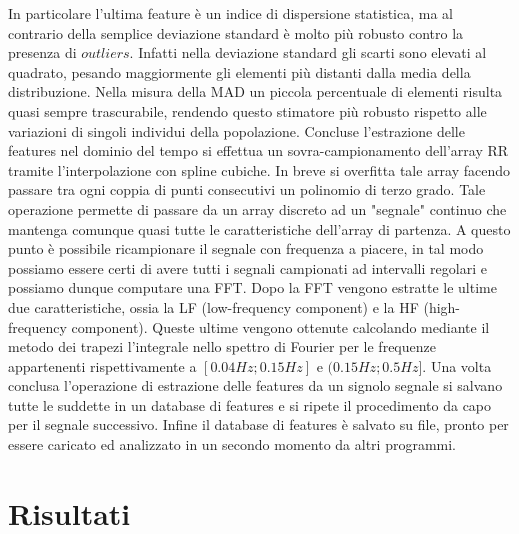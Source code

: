 \documentclass[a4paper, 12pt]{book}
\begin{document}
In particolare l'ultima feature è un indice di dispersione statistica, ma al contrario della semplice deviazione standard è molto più robusto contro la presenza di $outliers$.
Infatti nella deviazione standard gli scarti sono elevati al quadrato, pesando maggiormente gli elementi più distanti dalla media della distribuzione.
Nella misura della MAD un piccola percentuale di elementi risulta quasi sempre trascurabile, rendendo questo stimatore più robusto rispetto alle variazioni di singoli individui della popolazione.
Concluse l'estrazione delle features nel dominio del tempo si effettua un sovra-campionamento dell'array RR tramite l'interpolazione con spline cubiche.
In breve si overfitta tale array facendo passare tra ogni coppia di punti consecutivi un polinomio di terzo grado.
Tale operazione permette di passare da un array discreto ad un "segnale" continuo che mantenga comunque quasi tutte le caratteristiche dell'array di partenza.
A questo punto è possibile ricampionare il segnale con frequenza a piacere, in tal modo possiamo essere certi di avere tutti i segnali campionati ad intervalli regolari e possiamo dunque computare una FFT.
Dopo la FFT vengono estratte le ultime due caratteristiche, ossia la LF (low-frequency component) e la HF (high-frequency component).
Queste ultime vengono ottenute calcolando mediante il metodo dei trapezi l'integrale nello spettro di Fourier per le frequenze appartenenti rispettivamente a $[0.04Hz;0.15Hz]$ e $(0.15Hz;0.5Hz]$.
Una volta conclusa l'operazione di estrazione delle features da un signolo segnale si salvano tutte le suddette in un database di features e si ripete il procedimento da capo per il segnale successivo.
Infine il database di features è salvato su file, pronto per essere caricato ed analizzato in un secondo momento da altri programmi.
%




\chapter{Risultati}
\end{document}
